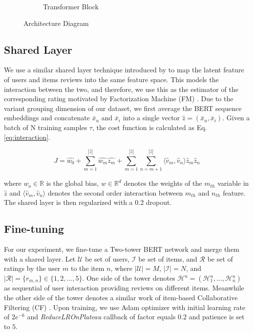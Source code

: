 \documentclass[11pt,a4paper]{article}
\begin{document}
\begin{figure}[t!]
\begin{subfigure}[b]{0.3\textwidth}
         \caption{Transformer Block}
         \label{fig:f2}
     \end{subfigure}
        \caption{Architecture Diagram}
        \label{fig:Architecture Diagram}
\end{figure}

\subsection{Shared Layer}

We use a similar shared layer technique introduced by \citet{zheng2017joint-modeling} to map the latent feature of users and items reviews into the same feature space. This models the interaction between the two, and therefore, we use this as the estimator of the corresponding rating motivated by Factorization Machine (FM) \citep{rendle2012factorization}. Due to the variant grouping dimension of our dataset, we first average the BERT sequence embeddings and concatenate $\bar{x}_u$ and $\bar{x}_i$ into a single vector $\hat{z} = (\bar{x}_u, \bar{x}_i)$. Given a batch of N training samples $\tau$, the cost function is calculated as Eq.\eqref{eq:interaction}.

\begin{equation}\label{eq:interaction}
    J = \hat{w_0} + \sum_{m=1}^{|\hat{z}|} \hat{w_m} \hat{z_m} + \sum_{m=1}^{|\hat{z}|} \sum_{n=m+1}^{|\hat{z}|} \langle \hat{v}_m, \hat{v}_n \rangle \hat{z}_m \hat{z}_n
\end{equation}

where $w_o \in \mathbb{R}$ is the global bias, $w \in \mathbb{R}^d$ denotes the weights of the $m_{th}$ variable in $\hat{z}$ and $\langle \hat{v}_m, \hat{v}_n \rangle$ denotes the second order interaction between $m_{th}$ and $n_{th}$ feature. The shared layer is then regularized with a 0.2 dropout.

\subsection{Fine-tuning}

For our experiment, we fine-tune a Two-tower BERT network and merge them with a shared layer. Let $\mathcal{U}$ be set of users, $\mathcal{I}$ be set of items, and $\mathcal{R}$ be set of ratings by the user $m$ to the item $n$, where $|\mathcal{U}| = M$, $|\mathcal{I}| = N$, and $|\mathcal{R}| = \{r_{m,n}\} \in \{1,2, \ldots, 5\}$. One side of the tower denotes $\mathcal{H}^u = (\mathcal{H}_1^u, \ldots, \mathcal{H}_n^u)$ as sequential of user interaction providing reviews on different items. Meanwhile the other side of the tower denotes a similar work of item-based Collaborative Filtering (CF) \citep{amjad-cf-2018}. Upon training, we use Adam optimizer with initial learning rate of $2e^{-6}$ and  \emph{ReduceLROnPlateau} callback of factor equals $0.2$ and patience is set to $5$.
\end{document}
